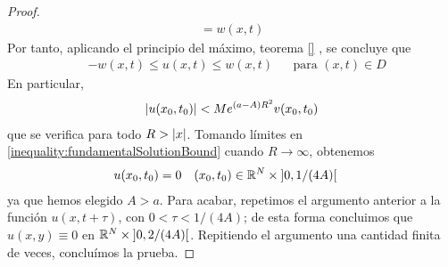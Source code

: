 \documentclass{article}
\newcommand{\realNumbers}{\mathbb{R}}
\newcommand{\leftOpenInterval}{\left]}
\newcommand{\rightOpenInterval}{\right[}
\newcommand{\leftClosedInterval}{\left[}
\newcommand{\rightClosedInterval}{\right]}
\newcommand{\interval}[3]{%
  \ifstrequal{#1}{oo}{%
    \leftOpenInterval #2, #3 \rightOpenInterval%
  }{%
    \ifstrequal{#1}{co}{%
      \leftClosedInterval #2, #3 \rightOpenInterval%
    }{%
      \ifstrequal{#1}{oc}{
        \leftOpenInterval #2, #3 \rightClosedInterval%
      }{%
        \ifstrequal{#1}{cc}{
          \leftClosedInterval #2, #3 \rightClosedInterval
        }{%
        }%
      }%
    }%
  }%
}
\theoremstyle{remark}
\begin{document}
\begin{proof}
\begin{align}
    =
    w(x, t)
  \end{align}
  Por tanto, aplicando el principio del máximo, teorema 
  \ref{}  %
  , se concluye que
  \begin{align}
    &- w(x, t) \leq u(x, t) \leq w(x, t)
    && \text{para } (x, t) \in D
  \end{align}
  En particular,
  \begin{align}
    \label{inequality:fundamentalSolutionBound}
    \abs{u(x_0, t_0)}
    <
    M e^{(a - A) R^2} v(x_0, t_0)
  \end{align}
  que se verifica para todo \(R > \abs{x}\).
  Tomando límites en \ref{inequality:fundamentalSolutionBound} cuando \(R \rightarrow \infty\), obtenemos
  \begin{align}
    &u(x_0, t_0) = 0
    && (x_0, t_0) \in \realNumbers^N \times \interval{oo}{0}{1 / (4 A)}
  \end{align}
  ya que hemos elegido \(A > a\).
  Para acabar, repetimos el argumento anterior a la función \(u(x, t + \tau)\), con \(0 < \tau < 1 / (4 A)\);
  de esta forma concluimos que \(u(x, y) \equiv 0\) en \(\realNumbers^N \times \interval{oo}{0}{ 2 / (4 A)}\).
  Repitiendo el argumento una cantidad finita de veces, concluímos la prueba.
  
  
  
\end{proof}
\end{document}
